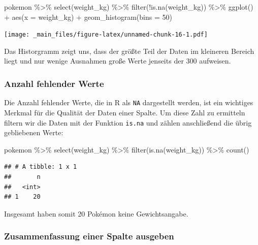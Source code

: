 \documentclass[
]{book}
\newenvironment{Shaded}{\begin{snugshade}}{\end{snugshade}}
\newcommand{\AttributeTok}[1]{\textcolor[rgb]{0.77,0.63,0.00}{#1}}
\newcommand{\DecValTok}[1]{\textcolor[rgb]{0.00,0.00,0.81}{#1}}
\newcommand{\FunctionTok}[1]{\textcolor[rgb]{0.00,0.00,0.00}{#1}}
\newcommand{\NormalTok}[1]{#1}
\newcommand{\SpecialCharTok}[1]{\textcolor[rgb]{0.00,0.00,0.00}{#1}}
\begin{document}
\begin{Shaded}
\begin{Highlighting}[]
\NormalTok{pokemon }\SpecialCharTok{\%\textgreater{}\%}
  \FunctionTok{select}\NormalTok{(weight\_kg) }\SpecialCharTok{\%\textgreater{}\%}
  \FunctionTok{filter}\NormalTok{(}\SpecialCharTok{!}\FunctionTok{is.na}\NormalTok{(weight\_kg)) }\SpecialCharTok{\%\textgreater{}\%}
  \FunctionTok{ggplot}\NormalTok{() }\SpecialCharTok{+}
  \FunctionTok{aes}\NormalTok{(}\AttributeTok{x =}\NormalTok{ weight\_kg) }\SpecialCharTok{+}
  \FunctionTok{geom\_histogram}\NormalTok{(}\AttributeTok{bins =} \DecValTok{50}\NormalTok{)}
\end{Highlighting}
\end{Shaded}

\texttt{[image: \_main\_files/figure-latex/unnamed-chunk-16-1.pdf]}

Das Historgramm zeigt uns, dass der größte Teil der Daten im kleineren Bereich liegt und nur wenige Ausnahmen große Werte jenseits der 300 aufweisen.

\hypertarget{anzahl-fehlender-werte}{%
\subsubsection{Anzahl fehlender Werte}\label{anzahl-fehlender-werte}}

Die Anzahl fehlender Werte, die in R als \texttt{NA} dargestellt werden, ist ein wichtiges Merkmal für die Qualität der Daten einer Spalte. Um diese Zahl zu ermitteln filtern wir die Daten mit der Funktion \texttt{is.na} und zählen anschließend die übrig gebliebenen Werte:

\begin{Shaded}
\begin{Highlighting}[]
\NormalTok{pokemon }\SpecialCharTok{\%\textgreater{}\%}
  \FunctionTok{select}\NormalTok{(weight\_kg) }\SpecialCharTok{\%\textgreater{}\%}
  \FunctionTok{filter}\NormalTok{(}\FunctionTok{is.na}\NormalTok{(weight\_kg)) }\SpecialCharTok{\%\textgreater{}\%}
  \FunctionTok{count}\NormalTok{()}
\end{Highlighting}
\end{Shaded}

\begin{verbatim}
## # A tibble: 1 x 1
##       n
##   <int>
## 1    20
\end{verbatim}

Insgesamt haben somit 20 Pokémon keine Gewichtsangabe.

\hypertarget{zusammenfassung-einer-spalte-ausgeben}{%
\subsubsection{Zusammenfassung einer Spalte ausgeben}\label{zusammenfassung-einer-spalte-ausgeben}}
\end{document}
